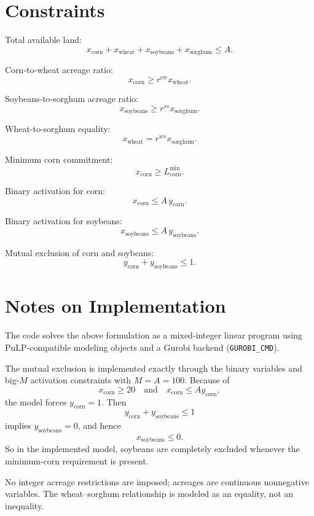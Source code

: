 \section*{Constraints}

Total available land:
\[
x_{\text{corn}} + x_{\text{wheat}} + x_{\text{soybeans}} + x_{\text{sorghum}} \le A.
\]

Corn-to-wheat acreage ratio:
\[
x_{\text{corn}} \ge r^{cw} x_{\text{wheat}}.
\]

Soybeans-to-sorghum acreage ratio:
\[
x_{\text{soybeans}} \ge r^{ss} x_{\text{sorghum}}.
\]

Wheat-to-sorghum equality:
\[
x_{\text{wheat}} = r^{ws} x_{\text{sorghum}}.
\]

Minimum corn commitment:
\[
x_{\text{corn}} \ge L^{\min}_{\text{corn}}.
\]

Binary activation for corn:
\[
x_{\text{corn}} \le A\, y_{\text{corn}}.
\]

Binary activation for soybeans:
\[
x_{\text{soybeans}} \le A\, y_{\text{soybeans}}.
\]

Mutual exclusion of corn and soybeans:
\[
y_{\text{corn}} + y_{\text{soybeans}} \le 1.
\]

\section*{Notes on Implementation}

The code solves the above formulation as a mixed-integer linear program using PuLP-compatible modeling objects and a Gurobi backend (\texttt{GUROBI\_CMD}).

The mutual exclusion is implemented exactly through the binary variables and big-\(M\) activation constraints with \(M=A=100\). Because of
\[
x_{\text{corn}} \ge 20
\quad\text{and}\quad
x_{\text{corn}} \le A y_{\text{corn}},
\]
the model forces \(y_{\text{corn}}=1\). Then
\[
y_{\text{corn}} + y_{\text{soybeans}} \le 1
\]
implies \(y_{\text{soybeans}}=0\), and hence
\[
x_{\text{soybeans}} \le 0.
\]
So in the implemented model, soybeans are completely excluded whenever the minimum-corn requirement is present.

No integer acreage restrictions are imposed; acreages are continuous nonnegative variables. The wheat--sorghum relationship is modeled as an equality, not an inequality.
